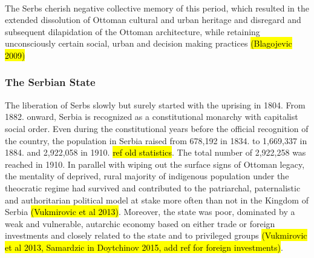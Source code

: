 \documentclass[11pt]{report}
\begin{document}
\\
The Serbs cherish negative collective memory of this period, which resulted in the extended dissolution of Ottoman cultural and urban heritage and disregard and subsequent dilapidation of the Ottoman architecture, while retaining unconsciously certain social, urban and decision making practices \hl{(Blagojevic 2009)}
\subsubsection{The Serbian State}
The liberation of Serbs slowly but surely started with the uprising in 1804. From 1882. onward, Serbia is recognized as a constitutional monarchy with capitalist social order. Even during the constitutional years before the official recognition of the country, the population in Serbia raised from 678,192 in 1834. to 1,669,337 in 1884. and 2,922,058 in 1910. \hl{ref old statistics}. The total number of 2,922,258 was reached in 1910. 
In parallel with wiping out the surface signs of Ottoman legacy, the mentality of deprived, rural majority of indigenous population under the theocratic regime had survived and contributed to the patriarchal, paternalistic and authoritarian political model \footnotemark  at stake more often than not in the Kingdom of Serbia \hl{(Vukmirovic et al 2013)}. Moreover, the state was poor, dominated by a weak and vulnerable, autarchic economy based on either trade or foreign investments and closely related to the state and to privileged groups \hl{(Vukmirovic et al 2013, Samardzic in Doytchinov 2015, add ref for foreign investments)}.
\\
\end{document}
